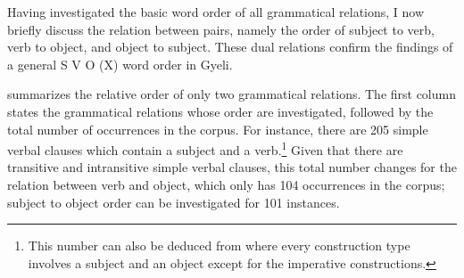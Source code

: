 

Having investigated the basic word order of all grammatical relations, I now briefly discuss the relation between pairs, namely the order of subject to verb, verb to object, and object to subject. These dual relations confirm the findings of a general S V O (X) word order in Gyeli.

 summarizes the relative order of only two grammatical relations. The first column states the grammatical relations whose order are investigated, followed by the total number of occurrences in the corpus. For instance, there are 205 simple verbal clauses which contain a subject and a verb.\footnote{This number can also be deduced from  where every construction type involves a subject and an object except for the imperative constructions.} Given that there are transitive and intransitive simple verbal clauses, this total number changes for the relation between verb and object, which only has 104 occurrences in the corpus; subject to object order can be investigated for 101 instances.


